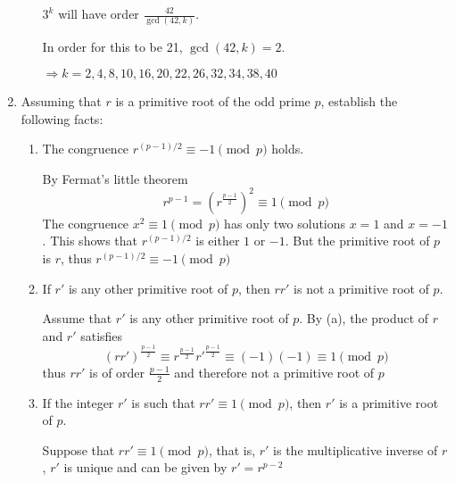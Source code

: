 \documentclass[12pt]{exam}
\theoremstyle{definition}
\begin{document}
\begin{enumerate}
\begin{enumerate}
\begin{answer}
                  $3^k$ will have order $\frac{42}{\gcd(42, k)}$.

                  In order for this to be 21, $\gcd(42, k) = 2$.

                  $\Rightarrow k = 2, 4, 8, 10, 16, 20, 22, 26, 32, 34, 38, 40$
            \end{answer}
      \end{enumerate}

      \setcounter{enumi}{5}
      \item Assuming that $r$ is a primitive root of the odd prime $p$, establish the following facts:

      \begin{enumerate}
            \item The congruence $r^{(p-1)/2} \equiv -1 \pmod p$ holds.
            \begin{answer}
                  By Fermat's little theorem 
                  \[
                        r^{p-1} = {(r^{\frac{p-1}{2}})}^2 \equiv 1 \pmod p
                  \]
                  The congruence $x^2 \equiv 1 \pmod p$ has only two solutions $x = 1$ and $x = -1$. This shows that
                  $r^{(p-1)/2}$ is either $1$ or $-1$. But the primitive root of $p$ is $r$, thus $r^{(p-1)/2} \equiv -1 \pmod p$
            \end{answer}
            \item If $r\prime$ is any other primitive root of $p$, then $rr\prime$ is not a primitive root of $p$.
            \begin{answer}
                  Assume that $r'$ is any other primitive root of $p$. By (a), the product of $r$ and $r'$ satisfies
                  \[
                        {(rr')}^{\frac{p-1}{2}} \equiv r^{\frac{p-1}{2}} {r'}^{\frac{p-1}{2}} \equiv (-1)(-1) \equiv 1 \pmod p
                  \]
                  thus $rr'$ is of order ${\frac{p-1}{2}}$ and therefore not a primitive root of $p$
            \end{answer}
            \item If the integer $r\prime$ is such that $rr\prime \equiv 1 \pmod p$, then $r\prime$ is a primitive root of $p$.
            \begin{answer}
                  Suppose that $rr' \equiv 1 \pmod p$, that is, $r'$ is the multiplicative inverse of $r$,
                  $r'$ is unique and can be given by $r' = r^{p-2}$


\end{answer}
\end{enumerate}
\end{enumerate}
\end{document}
